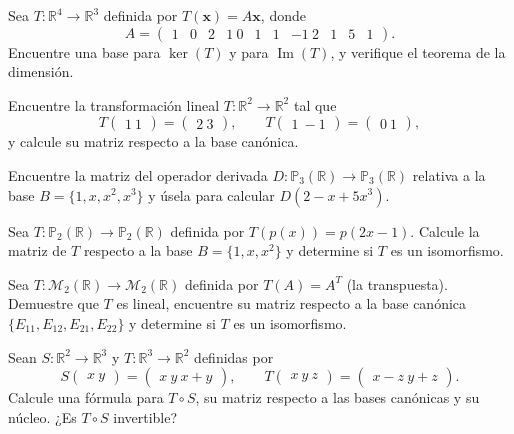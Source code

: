 \begin{prob}
Sea $T: \mathbb{R}^4 \to \mathbb{R}^3$ definida por $T(\mathbf{x}) = A\mathbf{x}$, donde
\[
A = \begin{pmatrix} 1 & 0 & 2 & 1 \ 0 & 1 & 1 & -1 \ 2 & 1 & 5 & 1 \end{pmatrix}.
\]
Encuentre una base para $\ker(T)$ y para $\operatorname{Im}(T)$, y verifique el teorema de la dimensión.
\end{prob}

\begin{prob}
Encuentre la transformación lineal $T:\mathbb{R}^2 \to \mathbb{R}^2$ tal que
\[
T\begin{pmatrix} 1 \ 1 \end{pmatrix} = \begin{pmatrix} 2 \ 3 \end{pmatrix}, \qquad T\begin{pmatrix} 1 \ -1 \end{pmatrix} = \begin{pmatrix} 0 \ 1 \end{pmatrix},
\]
y calcule su matriz respecto a la base canónica.
\end{prob}

\begin{prob}
Encuentre la matriz del operador derivada $D:\mathbb{P}_3(\mathbb{R}) \to \mathbb{P}_3(\mathbb{R})$ relativa a la base $B = \{1, x, x^2, x^3\}$ y úsela para calcular $D(2 - x + 5x^3)$.
\end{prob}

\begin{prob}
Sea $T:\mathbb{P}_2(\mathbb{R}) \to \mathbb{P}_2(\mathbb{R})$ definida por $T(p(x)) = p(2x-1)$. Calcule la matriz de $T$ respecto a la base $B = \{1, x, x^2\}$ y determine si $T$ es un isomorfismo.
\end{prob}

\begin{prob}
Sea $T:\mathcal{M}_2(\mathbb{R}) \to \mathcal{M}_2(\mathbb{R})$ definida por $T(A) = A^{T}$ (la transpuesta). Demuestre que $T$ es lineal, encuentre su matriz respecto a la base canónica $\{E_{11}, E_{12}, E_{21}, E_{22}\}$ y determine si $T$ es un isomorfismo.
\end{prob}

\begin{prob}
Sean $S:\mathbb{R}^2 \to \mathbb{R}^3$ y $T:\mathbb{R}^3 \to \mathbb{R}^2$ definidas por
\[
S\begin{pmatrix} x \ y \end{pmatrix} = \begin{pmatrix} x \ y \ x+y \end{pmatrix}, \qquad
T\begin{pmatrix} x \ y \ z \end{pmatrix} = \begin{pmatrix} x - z \ y + z \end{pmatrix}.
\]
Calcule una fórmula para $T \circ S$, su matriz respecto a las bases canónicas y su núcleo. ¿Es $T \circ S$ invertible?
\end{prob}

